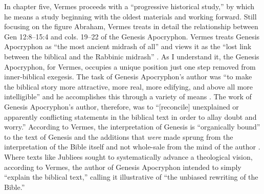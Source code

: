 In chapter five, Vermes proceeds with a ``progressive historical
study,'' by which he means a study beginning with the oldest materials
and working forward. Still focusing on the figure Abraham, Vermes treats
in detail the relationship between Gen 12:8--15:4 and cols. 19--22 of
the Genesis Apocryphon. Vermes treats Genesis Apocryphon as ``the most
ancient midrash of all''\autocite[124]{vermes1961} and views it as the
``lost link between the biblical and the Rabbinic midrash''
\autocite[124]{vermes1961}. As I understand it, the Genesis Apocryphon,
for Vermes, occupies a unique position just one step removed from
inner-biblical exegesis. The task of Genesis Apocryphon's author was
``to make the biblical story more attractive, more real, more edifying,
and above all more intelligible'' and he accomplishes this through a
variety of means \autocite[125]{vermes1961}. The work of
Genesis Apocryphon's author, therefore, was to ``{[}reconcile{]}
unexplained or apparently conflicting statements in the biblical text in
order to allay doubt and worry.''\autocite[125]{vermes1961} According to
Vermes, the interpretation of Genesis is ``organically bound'' to the
text of Genesis and the additions that \emph{were} made sprung from the
interpretation of the Bible itself and not whole-sale from the mind of
the author \autocite[126]{vermes1961}. Where texts like Jubliees sought
to systematically advance a theological vision, according to Vermes, the
author of Genesis Apocryphon intended to simply ``explain the biblical
text,'' calling it illustrative of ``the unbiased rewriting of the
Bible.''\autocite[126]{vermes1961}

